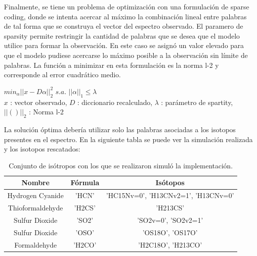 Finalmente, se tiene un problema de optimización con una formulación de sparse coding, donde se intenta acercar  al máximo la combinación lineal entre palabras de tal forma que se construya el vector del espectro observado. El paramero de sparsity permite restringir la cantidad de palabras que se desea que el modelo utilice para formar la observación. En este caso se asignó un valor elevado para que el modelo pudiese acercarse lo máximo posible a la observación sin límite de palabras.  La función a minimizar en esta formulación es la norma l-2 y corresponde al error cuadrático medio.


\begin{center}
$min_{\alpha} ||x-D\alpha||_2^2$ 
$s.a.$ 
$||\alpha||_1 \leq \lambda$ \\
$x$ : vector observado, 
$D$ : diccionario recalculado, 
$\lambda$ : parámetro de spartity, 
$||()||_2$ : Norma l-2
\end{center}


La solución óptima debería utilizar solo las palabras asociadas a los isotopos presentes en el espectro. En la siguiente tabla se puede ver la simulación realizada y los isotopos rescatados:

\begin {table}[H]
\begin{center}
	\begin{tabular}{|c|c|c|}
		\hline Nombre & Fórmula &  Isótopos \\ 
		

		\hline	Hydrogen Cyanide & 'HCN' & 'HC15Nv=0', 'H13CNv2=1', 'H13CNv=0'\\ 
		
		\hline	Thioformaldehyde & 'H2CS' & 'H213CS' \\
		
		\hline	Sulfur Dioxide & 'SO2' & 'SO2v=0', 'SO2v2=1' \\
		
		\hline	Sulfur Dioxide & 'OSO' & 'OS18O', 'OS17O' \\
		
		\hline	Formaldehyde & 'H2CO'  & 'H2C18O', 'H213CO' \\
				
		\hline 
	\end{tabular}
	\caption {Conjunto de isótropos con los que se realizaron simuló la implementación.}
\end{center}
\end{table}

